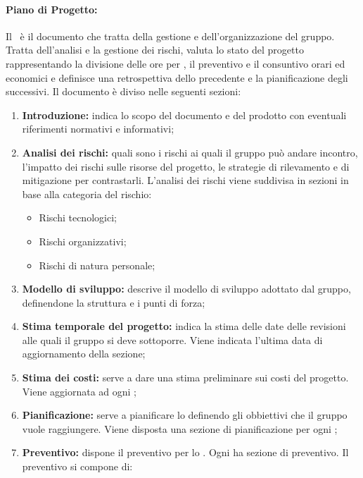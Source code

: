 \paragraph{Piano di Progetto:}
Il \PdP\ è il documento che tratta della gestione e dell'organizzazione del gruppo. Tratta dell'analisi e la gestione dei rischi, valuta lo stato del progetto rappresentando la divisione delle ore per , il preventivo e il consuntivo orari ed economici e definisce una retrospettiva dello  precedente e la pianificazione degli  successivi.
Il documento è diviso nelle seguenti sezioni:
\begin{enumerate}
  \item \textbf{Introduzione:} indica lo scopo del documento e del prodotto con eventuali riferimenti normativi e informativi;
  \item \textbf{Analisi dei rischi:} quali sono i rischi ai quali il gruppo può andare incontro, l'impatto dei rischi sulle risorse del progetto, le strategie di rilevamento e di mitigazione per contrastarli. L'analisi dei rischi viene suddivisa in sezioni in base alla categoria del rischio:
  \begin{itemize}
    \item Rischi tecnologici;
    \item Rischi organizzativi;
    \item Rischi di natura personale;
  \end{itemize} 
  \item \textbf{Modello di sviluppo:} descrive il modello di sviluppo adottato dal gruppo, definendone la struttura e i punti di forza;
  \item \textbf{Stima temporale del progetto:} indica la stima delle date delle revisioni alle quali il gruppo si deve sottoporre. Viene indicata l'ultima data di aggiornamento della sezione;
  \item \textbf{Stima dei costi:} serve a dare una stima preliminare sui costi del progetto. Viene aggiornata ad ogni ;
  \item \textbf{Pianificazione:} serve a pianificare lo  definendo gli obbiettivi che il gruppo vuole raggiungere. Viene disposta una sezione di pianificazione per ogni ;
  \item \textbf{Preventivo:} dispone il preventivo per lo . Ogni  ha sezione di preventivo. Il preventivo si compone di:

\end{enumerate}
